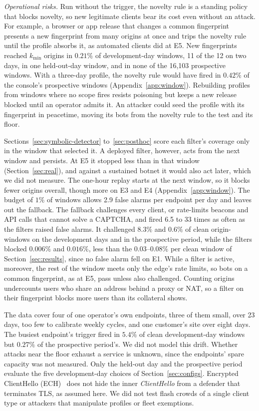 \documentclass[conference,letterpaper,10pt]{IEEEtran}
\newcommand\1{\textit{(i)}}
\newcommand\2{\textit{(ii)}}
\newcommand\3{\textit{(iii)}}
\newcommand\4{\textit{(iv)}}
\newcommand\5{\textit{(v)}}
\newcommand\6{\textit{(vi)}}
\newcommand\7{\textit{(vii)}}
\newcommand\8{\textit{(viii)}}
\newcommand\9{\textit{(ix)}}
\begin{document}
\textit{Operational risks.} Run without the trigger, the novelty rule is a standing policy that blocks novelty, so new legitimate clients bear its cost even without an attack. For example, a browser or app release that changes a common fingerprint presents a new fingerprint from many origins at once and trips the novelty rule until the profile absorbs it, as automated clients did at E5. New fingerprints reached $k_{\min}$ origins in $0.21\%$ of development-day windows, 11 of the 12 on two days, in one held-out-day window, and in none of the 16,103 prospective windows.  With a three-day profile, the novelty rule would have fired in $0.42\%$ of the console's prospective windows (Appendix~\ref{app:window}).   Rebuilding profiles from windows where no scope fires resists poisoning but keeps a new release blocked until an operator admits it. An attacker could seed the profile with its fingerprint in peacetime, moving its bots from the novelty rule to the test and its floor.

Sections~\ref{sec:symbolic-detector} to~\ref{sec:posthoc} score each filter's coverage only in the window that selected it. A deployed filter, however, acts from the next window and persists. At E5 it stopped less than in that window (Section~\ref{sec:real}), and against a sustained botnet it would also act later, which we did not measure. The one-hour replay starts at the next window, so it blocks fewer origins overall, though more on E3 and E4 (Appendix~\ref{app:window}). The budget of $1\%$ of windows allows 2.9 false alarms per endpoint per day and leaves out the fallback. The fallback challenges every client, or rate-limits beacons and API calls that cannot solve a CAPTCHA, and fired 6.5 to 33 times as often as the filters raised false alarms. It challenged $8.3\%$ and $0.6\%$ of clean origin-windows on the development days and in the prospective period, while the filters blocked $0.006\%$ and $0.016\%$, less than the $0.03$--$0.08\%$ per clean window of Section~\ref{sec:results}, since no false alarm fell on E1.  While a filter is active, moreover, the rest of the window meets only the edge's rate limits, so bots on a common fingerprint, as at E5, pass unless also challenged. Counting origins undercounts users who share an address behind a proxy or NAT, so a filter on their fingerprint blocks more users than its collateral shows.

The data cover four of one operator's own endpoints, three of them small, over 23 days, too few to calibrate weekly cycles, and one customer's site over eight days. The busiest endpoint's trigger fired in $5.4\%$ of clean development-day windows but $0.27\%$ of the prospective period's. We did not model this drift. Whether attacks near the floor exhaust a service is unknown, since the endpoints' spare capacity was not measured. Only the held-out day and the prospective period evaluate the five development-day choices of Section~\ref{sec:configs}.  Encrypted ClientHello (ECH)~\cite{ietf2026ech} does not hide the inner \textit{ClientHello} from a defender that terminates TLS, as assumed here. We did not test flash crowds of a single client type or attackers that manipulate profiles or fleet exemptions.
\end{document}
